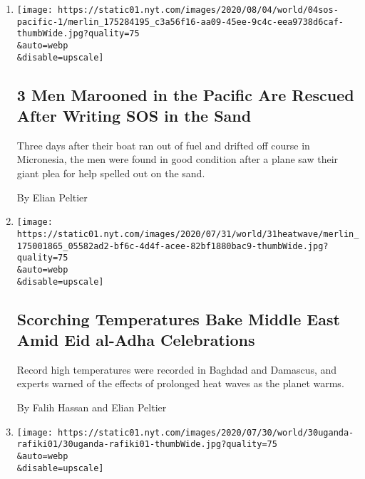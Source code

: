 \begin{enumerate}
\def\labelenumi{\arabic{enumi}.}
\item
  \href{/2020/08/04/world/australia/sos-pacific-island.html}{}

  \texttt{[image: https://static01.nyt.com/images/2020/08/04/world/04sos-pacific-1/merlin\_175284195\_c3a56f16-aa09-45ee-9c4c-eea9738d6caf-thumbWide.jpg?quality=75\\\&auto=webp\\\&disable=upscale]}

  \hypertarget{3-men-marooned-in-the-pacific-are-rescued-after-writing-sos-in-the-sand}{%
  \subsection{3 Men Marooned in the Pacific Are Rescued After Writing
  SOS in the
  Sand}\label{3-men-marooned-in-the-pacific-are-rescued-after-writing-sos-in-the-sand}}

  Three days after their boat ran out of fuel and drifted off course in
  Micronesia, the men were found in good condition after a plane saw
  their giant plea for help spelled out on the sand.

  By Elian Peltier
\item
  \href{/2020/07/31/world/middleeast/Middle-East-heat-wave.html}{}

  \texttt{[image: https://static01.nyt.com/images/2020/07/31/world/31heatwave/merlin\_175001865\_05582ad2-bf6c-4d4f-acee-82bf1880bac9-thumbWide.jpg?quality=75\\\&auto=webp\\\&disable=upscale]}

  \hypertarget{scorching-temperatures-bake-middle-east-amid-eid-al-adha-celebrations}{%
  \subsection{Scorching Temperatures Bake Middle East Amid Eid al-Adha
  Celebrations}\label{scorching-temperatures-bake-middle-east-amid-eid-al-adha-celebrations}}

  Record high temperatures were recorded in Baghdad and Damascus, and
  experts warned of the effects of prolonged heat waves as the planet
  warms.

  By Falih Hassan and Elian Peltier
\item
  \href{/2020/07/30/world/europe/poacher-gorilla-rafiki-silverback-uganda-prison.html}{}

  \texttt{[image: https://static01.nyt.com/images/2020/07/30/world/30uganda-rafiki01/30uganda-rafiki01-thumbWide.jpg?quality=75\\\&auto=webp\\\&disable=upscale]}


\end{enumerate}
